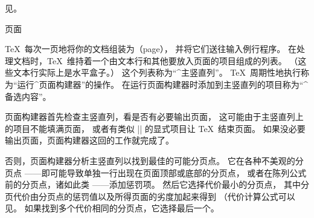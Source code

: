 {{{{{%

{}
见。
\endconcept


\concept 页面

\TeX\ 每次一页地将你的文档组装为（page），
并将它们送往输入例行程序。
在处理文档时，\TeX\ 维持着一个由文本行和其他要放入页面的项目组成的列表。%
（这些文本行实际上是水平盒子。）
这个列表称为“^{主竖直列}”。
\TeX\ 周期性地执行称为“运行^{页面构建器}”的操作。
在运行页面构建器时添加到主竖直列的项目称为“^{备选内容}”。

页面构建器首先检查主竖直列，看是否有必要输出页面，
这可能由于主竖直列上的项目不能填满页面，
或者有类似 |\eject| \ctsref\eject 的显式项目让 \TeX\ 结束页面。
如果没必要输出页面，页面构建器这回的工作就完成了。

否则，页面构建器分析主竖直列以找到最佳的可能分页点。
它在各种不美观的分页点
——即可能导致单独一行出现在页面顶部或底部的分页点，
或者在陈列公式前的分页点，诸如此类
——添加惩罚项。
然后它选择代价最小的分页点，
其中分页代价由分页点的惩罚值以及所得页面的劣度加起来得到
（代价计算公式可以见。
如果找到多个代价相同的分页点，它选择最后一个。

}}}}}
